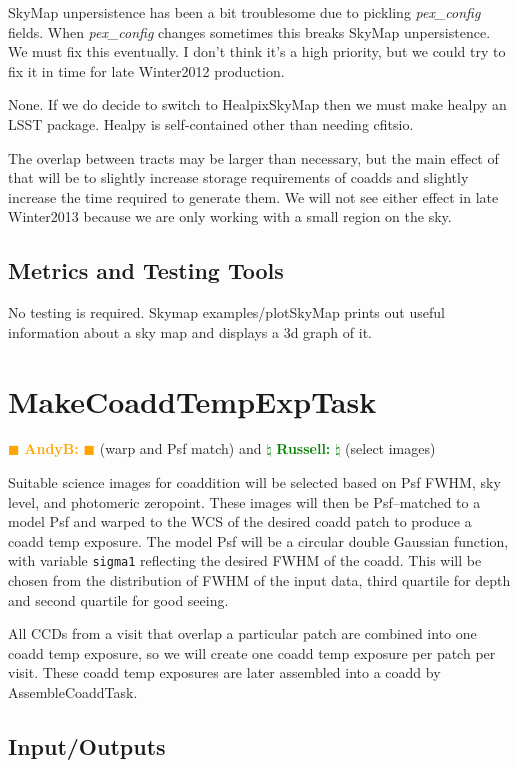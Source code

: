\documentclass[prd, nofootinbib, floatfix, 11pt,tightenlines,times]{article}
\newcommand{\becker} { \textcolor{orange} {
\ensuremath{\blacksquare} {\bf AndyB:}  
\ensuremath{\blacksquare} } }
\newcommand{\russ} { \textcolor{green} {
\ensuremath{\natural} {\bf Russell:}  
\ensuremath{\natural} } }
\begin{document}
SkyMap unpersistence has been a bit troublesome due to pickling {\it pex\_config} fields.
When {\it pex\_config} changes sometimes this breaks SkyMap unpersistence. We must fix this eventually.
I don't think it's a high priority, but we could try to fix it in time for late Winter2012 production.

None. If we do decide to switch to HealpixSkyMap then we must make healpy an LSST package.
Healpy is self-contained other than needing cfitsio.

The overlap between tracts may be larger than necessary, but the main effect of that
will be to slightly increase storage requirements of coadds and slightly increase
the time required to generate them. We will not see either effect in late Winter2013
because we are only working with a small region on the sky.

\subsection{Metrics and Testing Tools}

No testing is required.  Skymap examples/plotSkyMap prints out useful
information about a sky map and displays a 3d graph of it.


\clearpage 
\section{MakeCoaddTempExpTask} \becker (warp and Psf match) and \russ (select images)

Suitable science images for coaddition will be selected based on Psf FWHM, 
sky level, and photomeric zeropoint.  These images will then be Psf--matched to a model Psf and warped
to the WCS of the desired coadd patch to produce a coadd temp exposure.
The model Psf will be a circular double Gaussian
function, with variable {\tt sigma1} reflecting the desired FWHM of the coadd.  This will
be chosen from the distribution of FWHM of the input data, third quartile for depth and second
quartile for good seeing.

All CCDs from a visit that overlap a particular patch are combined into one coadd temp exposure,
so we will create one coadd temp exposure per patch per visit.
These coadd temp exposures are later assembled into a coadd by AssembleCoaddTask.

\subsection{Input/Outputs}
\end{document}
